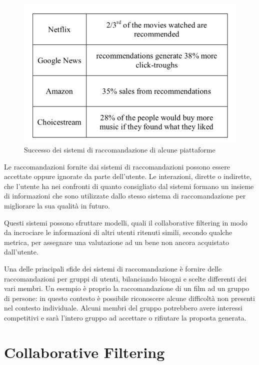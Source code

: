 \documentclass[letterpaper]{article}
\begin{document}
\begin{figure}[!htb]
    \begin{centering}
        \includegraphics[width=\linewidth]{Figures/successo.png}
        \caption{Successo dei sistemi di raccomandazione di alcune piattaforme \cite{ref1}}
        \label{fig:successo}
    \end{centering}
\end{figure}

Le raccomandazioni fornite dai sistemi di raccomandazioni possono essere accettate oppure ignorate da parte dell'utente. Le interazioni, dirette o indirette, che l'utente ha nei confronti di quanto consigliato dal sistemi formano un insieme di informazioni che sono utilizzate dallo stesso sistema di raccomandazione per migliorare la sua qualità in futuro.

Questi sistemi possono sfruttare modelli, quali il collaborative filtering in modo da incrociare le informazioni di altri utenti ritenuti simili, secondo qualche metrica, per assegnare una valutazione ad un bene non ancora acquistato dall'utente.

Una delle principali sfide dei sistemi di raccomandazione è fornire delle raccomandazioni per gruppi di utenti, bilanciando bisogni e scelte differenti dei vari membri. Un esempio è proprio la raccomandazione di un film ad un gruppo di persone: in questo contesto è possibile riconoscere alcune difficoltà non presenti nel contesto individuale. Alcuni membri del gruppo potrebbero avere interessi competitivi e sarà l'intero gruppo ad accettare o rifiutare la proposta generata.

\section{Collaborative Filtering}
\end{document}
